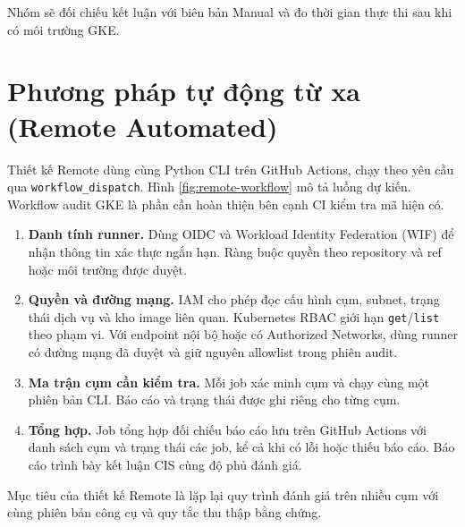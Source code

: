 Nhóm sẽ đối chiếu kết luận với biên bản Manual và đo thời gian thực thi sau khi có môi trường GKE.

\clearpage
\section{Phương pháp tự động từ xa (Remote Automated)}
\label{sec:remote-method}

Thiết kế Remote dùng cùng Python CLI trên GitHub Actions, chạy theo yêu cầu qua \texttt{workflow\_dispatch}. Hình \ref{fig:remote-workflow} mô tả luồng dự kiến. Workflow audit GKE là phần cần hoàn thiện bên cạnh CI kiểm tra mã hiện có.

\begin{center}
  \captionsetup{hypcap=false}
  
  \label{fig:remote-workflow}
\end{center}

\begin{enumerate}[leftmargin=1.0cm,itemsep=1pt,parsep=0pt]
  \item \textbf{Danh tính runner.} Dùng OIDC và Workload Identity Federation (WIF) để nhận thông tin xác thực ngắn hạn. Ràng buộc quyền theo repository và ref hoặc môi trường được duyệt.
  \item \textbf{Quyền và đường mạng.} IAM cho phép đọc cấu hình cụm, subnet, trạng thái dịch vụ và kho image liên quan. Kubernetes RBAC giới hạn \texttt{get}/\texttt{list} theo phạm vi. Với endpoint nội bộ hoặc có Authorized Networks, dùng runner có đường mạng đã duyệt và giữ nguyên allowlist trong phiên audit.
  \item \textbf{Ma trận cụm cần kiểm tra.} Mỗi job xác minh cụm và chạy cùng một phiên bản CLI. Báo cáo và trạng thái được ghi riêng cho từng cụm.
  \item \textbf{Tổng hợp.} Job tổng hợp đối chiếu báo cáo lưu trên GitHub Actions với danh sách cụm và trạng thái các job, kể cả khi có lỗi hoặc thiếu báo cáo. Báo cáo trình bày kết luận CIS cùng độ phủ đánh giá.
\end{enumerate}

Mục tiêu của thiết kế Remote là lặp lại quy trình đánh giá trên nhiều cụm với cùng phiên bản công cụ và quy tắc thu thập bằng chứng.
